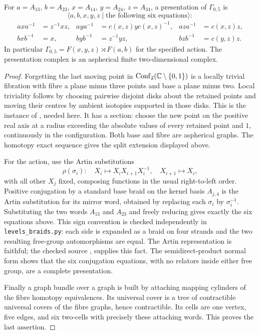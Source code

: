 \begin{proposition}\label{P5c2}
For $a=A_{13}$, $b=A_{23}$, $x=A_{14}$, $y=A_{24}$,
$z=A_{34}$, a presentation of $\Gamma_{0,5}$ is
\[
 \langle a,b,x,y,z\mid\text{the following six equations}\rangle:
\]
\begin{align*}
 axa^{-1}&=z^{-1}xz,&
 aya^{-1}&=c(x,z)y c(x,z)^{-1},&
 aza^{-1}&=c(x,z)z,\\
 bxb^{-1}&=x,&
 byb^{-1}&=z^{-1}yz,&
 bzb^{-1}&=c(y,z)z.
\end{align*}
In particular $\Gamma_{0,5}=F(x,y,z)\rtimes F(a,b)$ for the
specified action.  The presentation complex is an aspherical
finite two-dimensional complex.
\end{proposition}
\begin{proof}
Forgetting the last moving point in
$\operatorname{Conf}_2(\mathbb C\setminus\{0,1\})$ is a locally trivial
fibration with fibre a plane minus three points and base a plane
minus two.  Local triviality follows by choosing pairwise
disjoint disks about the retained points and moving their
centres by ambient isotopies supported in those disks.  This
is the instance of \citet[Theorem 1]{FadellNeuwirth1962},
needed here.  It has a section: choose the new point on the
positive real axis at a radius exceeding the absolute values
of every retained point and $1$, continuously in the configuration.
Both base and fibre are aspherical graphs.  The homotopy exact
sequence gives the split extension displayed above.

For the action, use the Artin substitutions
\[
 \rho(\sigma_i):\quad
 X_i\mapsto X_iX_{i+1}X_i^{-1},\quad
 X_{i+1}\mapsto X_i,
\]
with all other $X_j$ fixed, composing functions in the usual
right-to-left order.  Positive conjugation by a standard base
braid on the kernel basis $A_{j,4}$ is the Artin substitution
for its mirror word, obtained by replacing each $\sigma_i$ by
$\sigma_i^{-1}$.  Substituting the two words $A_{13}$ and
$A_{23}$ and freely reducing gives exactly the six equations
above.  This sign convention is checked independently in
\texttt{levels\_braids.py}: each side is expanded as a braid on
four strands and the two resulting free-group automorphisms
are equal.  The Artin representation is faithful; the checked
source \citet[Theorem A, case (1), parameter $1$]{Shpilrain2001}, supplies this fact.  The semidirect-product normal form
shows that the six conjugation equations, with no relators
inside either free group, are a complete presentation.

Finally a graph bundle over a graph is built by attaching
mapping cylinders of the fibre homotopy equivalences.  Its
universal cover is a tree of contractible universal covers of
the fibre graphs, hence contractible.  Its cells are one
vertex, five edges, and six two-cells with precisely these
attaching words.  This proves the last assertion.
\end{proof}

